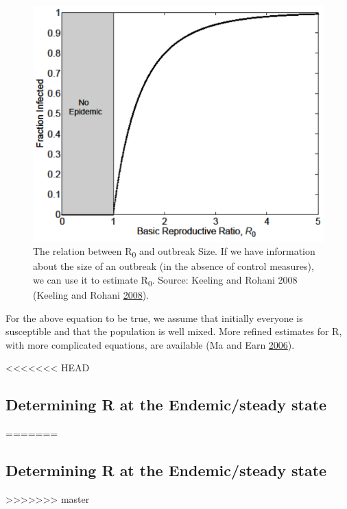 \documentclass[]{book}
\theoremstyle{definition}
\theoremstyle{definition}
\theoremstyle{definition}
\theoremstyle{remark}
\begin{document}
\begin{figure}
\centering
\includegraphics{./images/outbreaksize.png}
\caption{\label{fig:outbreaksize}The relation between R\textsubscript{0} and
outbreak Size. If we have information about the size of an outbreak (in
the absence of control measures), we can use it to estimate
R\textsubscript{0}. Source: Keeling and Rohani 2008 (Keeling and Rohani
\protect\hyperlink{ref-keeling08}{2008}).}
\end{figure}

For the above equation to be true, we assume that initially everyone is
susceptible and that the population is well mixed. More refined
estimates for R, with more complicated equations, are available (Ma and
Earn \protect\hyperlink{ref-ma06}{2006}).

<<<<<<< HEAD
\hypertarget{determining-r-at-the-endemicsteady-state}{%
\subsection{Determining R at the Endemic/steady
state}\label{determining-r-at-the-endemicsteady-state}}
=======
\subsection{Determining R at the Endemic/steady
state}\label{determining-r-at-the-endemicsteady-state}
>>>>>>> master
\end{document}
